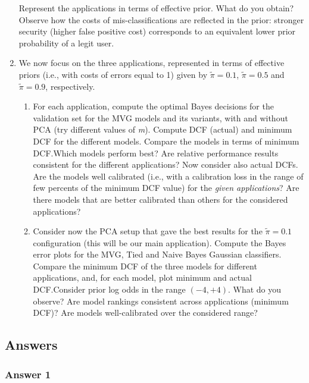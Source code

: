 \documentclass[a4paper, 12pt, english]{article}
\begin{document}
\begin{enumerate}
\begin{itemize}
        \end{itemize}
        Represent the applications in terms of effective prior. What do you obtain? Observe how the costs of mis-classifications are reflected in the prior: stronger security (higher false positive cost) corresponds to an equivalent lower prior probability of a legit user.
        \item We now focus on the three applications, represented in terms of effective priors (i.e., with costs of errors equal to 1) given by \(\widetilde{\pi} = 0.1\), \(\widetilde{\pi} = 0.5\) and \(\widetilde{\pi} = 0.9 \), respectively.
        \begin{enumerate}
            \item For each application, compute the optimal Bayes decisions for the validation set for the MVG models and its variants, with and without PCA (try different values of \textit{m}). Compute DCF (actual) and minimum DCF for the different models. Compare the models in terms of minimum DCF.\@ Which models perform best? Are relative performance results consistent for the different applications? Now consider also actual DCFs. Are the models well calibrated (i.e., with a calibration loss in the range of few percents of the minimum DCF value) for the \textit{given applications}? Are there models that are better calibrated than others for the considered applications?
            \item Consider now the PCA setup that gave the best results for the \(\widetilde{\pi} = 0.1\) configuration (this will be our main application). Compute the Bayes error plots for the MVG, Tied and Naive Bayes Gaussian classifiers. Compare the minimum DCF of the three models for different applications, and, for each model, plot minimum and actual DCF.\@ Consider prior log odds in the range \((-4,+4)\). What do you observe? Are model rankings consistent across applications (minimum DCF)? Are models well-calibrated over the considered range?
        \end{enumerate}


    \end{enumerate}

    \subsection{Answers}

    \subsubsection{Answer 1}
\end{document}
